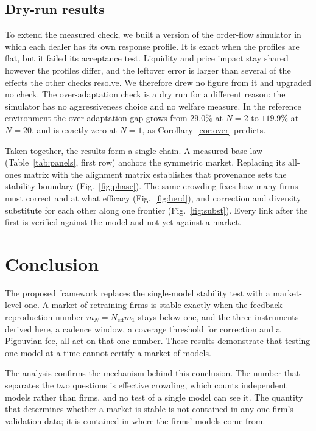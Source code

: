 \documentclass[conference]{IEEEtran}
\theoremstyle{plain}
\newcommand{\Neff}{N_{\mathrm{eff}}}
\newcommand{\mN}{m_N}
\begin{document}
\subsection{Dry-run results}
To extend the measured check, we built a version of the order-flow simulator in which each dealer has its own response profile. It is exact when the profiles are flat, but it failed its acceptance test. Liquidity and price impact stay shared however the profiles differ, and the leftover error is larger than several of the effects the other checks resolve. We therefore drew no figure from it and upgraded no check. The over-adaptation check is a dry run for a different reason: the simulator has no aggressiveness choice and no welfare measure. In the reference environment the over-adaptation gap grows from $29.0\%$ at $N=2$ to $119.9\%$ at $N=20$, and is exactly zero at $N=1$, as Corollary~\ref{cor:over} predicts.

Taken together, the results form a single chain. A measured base law (Table~\ref{tab:panels}, first row) anchors the symmetric market. Replacing its all-ones matrix with the alignment matrix establishes that provenance sets the stability boundary (Fig.~\ref{fig:phase}). The same crowding fixes how many firms must correct and at what efficacy (Fig.~\ref{fig:herd}), and correction and diversity substitute for each other along one frontier (Fig.~\ref{fig:subst}). Every link after the first is verified against the model and not yet against a market.

\section{Conclusion}
\label{sec:conclusion}

The proposed framework replaces the single-model stability test with a market-level one. A market of retraining firms is stable exactly when the feedback reproduction number $\mN=\Neff m_1$ stays below one, and the three instruments derived here, a cadence window, a coverage threshold for correction and a Pigouvian fee, all act on that one number. These results demonstrate that testing one model at a time cannot certify a market of models.

The analysis confirms the mechanism behind this conclusion. The number that separates the two questions is effective crowding, which counts independent models rather than firms, and no test of a single model can see it. The quantity that determines whether a market is stable is not contained in any one firm's validation data; it is contained in where the firms' models come from.
\end{document}
